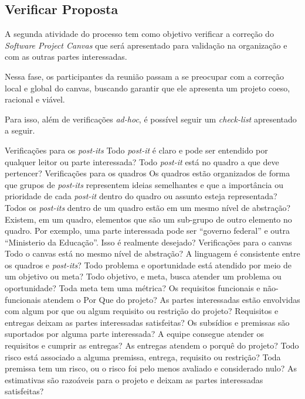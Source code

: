 \documentclass[fontsize=12pt, a4paper,pagesize=auto,toc=listof, ,twoside,chapterprefix=false,appendixprefix=true,open=right]{scrbook}
\begin{document}
\subsection{Verificar Proposta}

A segunda atividade do processo tem como objetivo verificar a correção do \textit{Software Project Canvas} que será apresentado para validação na organização e com as outras partes interessadas.

Nessa fase, os participantes da reunião passam a se preocupar com a correção local e global do canvas, buscando garantir que ele apresenta um projeto coeso, racional e viável.

Para isso, além de verificações \textit{ad-hoc}, é possível seguir um \textit{check-list} apresentado a seguir.
\begin{outline}
    \1 Verificações para os \textit{post-its}
    \2 Todo \textit{post-it} é claro e pode ser entendido por qualquer leitor ou parte interessada?
    \2 Todo \textit{post-it} está no quadro a que deve pertencer?
    \1 Verificações para os quadros
    \2 Os quadros estão organizados de forma que grupos de \textit{post-its} representem ideias semelhantes e que a importância ou prioridade de cada \textit{post-it} dentro do quadro ou assunto esteja representada?
    \2 Todos os \textit{post-its} dentro de um quadro estão em um mesmo nível de abstração?
    \2 Existem, em um quadro, elementos que são um sub-grupo de outro elemento no quadro. Por exemplo, uma parte interessada pode ser ``governo federal'' e outra ``Ministerio da Educação''. Isso é realmente desejado?
    \1 Verificações para o canvas
    \2 Todo o canvas está no mesmo nível de abstração?
    \2 A linguagem é consistente entre os quadros e \textit{post-its}?
    \2 Todo problema e oportunidade está atendido por meio de um objetivo ou meta?
    \2 Todo objetivo, e meta, busca atender um problema ou oportunidade?
    \2 Toda meta tem uma métrica?
    \2 Os requisitos funcionais e não-funcionais atendem o Por Que do projeto?
    \2 As partes interessadas estão envolvidas com algum por que ou algum requisito ou restrição do projeto?
    \2 Requisitos e entregas deixam as partes interessadas satisfeitas?
    \2 Os subsídios e premissas são suportados por alguma parte interessada?
    \2 A equipe consegue atender os requisitos e cumprir as entregas?
    \2 As entregas atendem o porquê do projeto?
    \2 Todo risco está associado a alguma premissa, entrega, requisito ou restrição?
    \2 Toda premissa tem um risco, ou o risco foi pelo menos avaliado e considerado nulo?
    \2 As estimativas são razoáveis para o projeto e deixam as partes interessadas satisfeitas?
\end{outline}
\end{document}
